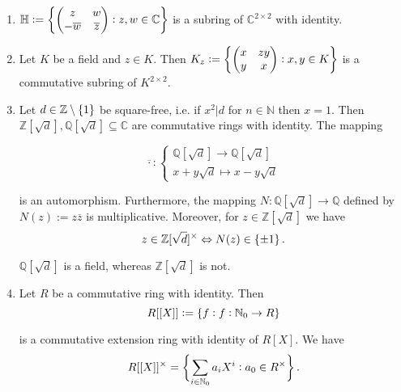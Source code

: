 \begin{example}[Rings]
	\mbox{}
	\begin{enumerate}[label = \textup{(}\alph*\textup{)}]
	\item $\mathbb{H} := \cbr[3]{\begin{pmatrix}
			z & w\\
			-\overline{w} & \overline{z} 
		\end{pmatrix}: z,w \in \mathbb{C}}$ is a subring of $\mathbb{C}^{2 \times 2}$ with identity.
	\item Let $K$ be a field and $z \in K$. Then $K_z := \cbr[3]{\begin{pmatrix}
			x & zy\\
			y & x 
		\end{pmatrix}: x,y \in K}$ is a commutative subring of $K^{2 \times 2}$. 
	\item Let $d \in \mathbb{Z} \setminus \cbr[0]{1}$ be square-free, i.e. if $x^2 | d$ for $n \in \mathbb{N}$ then $x = 1$. Then $\mathbb{Z}[\sqrt{d}], \mathbb{Q}[\sqrt{d}] \subseteq \mathbb{C}$ are commutative rings with identity. The mapping

		\begin{equation}
			\overline{\cdot}:\begin{cases}
				\mathbb{Q}[\sqrt{d}] \to \mathbb{Q}[\sqrt{d}]\\
				x + y\sqrt{d} \mapsto x - y\sqrt{d}
			\end{cases}
		\end{equation}

		\noindent is an automorphism. Furthermore, the mapping $N: \mathbb{Q}[\sqrt{d}] \to \mathbb{Q}$ defined by $N(z) := z\overline{z}$ is multiplicative. Moreover, for $z \in \mathbb{Z}[\sqrt{d}]$ we have 
		\begin{equation}
			z \in \mathbb{Z}[\sqrt{d}]^\times \Leftrightarrow N(z) \in \cbr[0]{\pm 1}.
		\end{equation}

		$\mathbb{Q}[\sqrt{d}]$ is a field, whereas $\mathbb{Z}[\sqrt{d}]$ is not.
	\item Let $R$ be a commutative ring with identity. Then 
		\begin{equation}
			R[[X]] := \cbr[0]{f : f: \mathbb{N}_0 \to R}
		\end{equation}

		\noindent is a commutative extension ring with identity of $R[X]$. We have 
		\begin{equation}
			R[[X]]^\times = \cbr[3]{\sum_{i \in \mathbb{N}_0} a_i X^i : a_0 \in R^\times}.
		\end{equation}


\end{enumerate}
\end{example}
